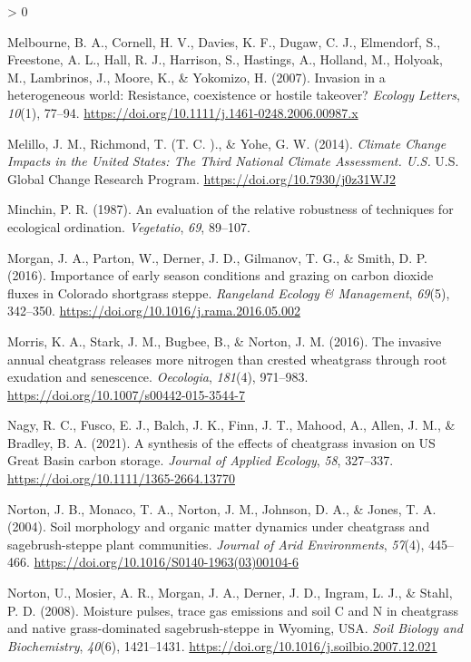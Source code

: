 \documentclass[
  11pt,
  a4paper,
]{article}
\newlength{\cslhangindent}
\newenvironment{CSLReferences}[2] %
 {%
  \setlength{\parindent}{0pt}
  \ifodd #1 \everypar{\setlength{\hangindent}{\cslhangindent}}\ignorespaces\fi
  \ifnum #2 > 0
  \setlength{\parskip}{#2\baselineskip}
  \fi
 }%
 {}
\begin{document}
\begin{CSLReferences}{1}{0}
\leavevmode\hypertarget{ref-Melbourne2007}{}%
Melbourne, B. A., Cornell, H. V., Davies, K. F., Dugaw, C. J., Elmendorf, S., Freestone, A. L., Hall, R. J., Harrison, S., Hastings, A., Holland, M., Holyoak, M., Lambrinos, J., Moore, K., \& Yokomizo, H. (2007). {Invasion in a heterogeneous world: Resistance, coexistence or hostile takeover?} \emph{Ecology Letters}, \emph{10}(1), 77--94. \url{https://doi.org/10.1111/j.1461-0248.2006.00987.x}

\leavevmode\hypertarget{ref-melillo2014}{}%
Melillo, J. M., Richmond, T. (T. C. )., \& Yohe, G. W. (2014). \emph{Climate {Change} {Impacts} in the {United} {States}: {The} {Third} {National} {Climate} {Assessment}. {U}.{S}.} U.S. Global Change Research Program. \url{https://doi.org/10.7930/j0z31WJ2}

\leavevmode\hypertarget{ref-Minchin1987}{}%
Minchin, P. R. (1987). {An evaluation of the relative robustness of techniques for ecological ordination}. \emph{Vegetatio}, \emph{69}, 89--107.

\leavevmode\hypertarget{ref-Morgan2016}{}%
Morgan, J. A., Parton, W., Derner, J. D., Gilmanov, T. G., \& Smith, D. P. (2016). Importance of {early} {season} {conditions} and {grazing} on {carbon} {dioxide} {fluxes} in {Colorado} {shortgrass} {steppe}. \emph{Rangeland Ecology \& Management}, \emph{69}(5), 342--350. \url{https://doi.org/10.1016/j.rama.2016.05.002}

\leavevmode\hypertarget{ref-Morris2016}{}%
Morris, K. A., Stark, J. M., Bugbee, B., \& Norton, J. M. (2016). {The invasive annual cheatgrass releases more nitrogen than crested wheatgrass through root exudation and senescence}. \emph{Oecologia}, \emph{181}(4), 971--983. \url{https://doi.org/10.1007/s00442-015-3544-7}

\leavevmode\hypertarget{ref-Nagy2021}{}%
Nagy, R. C., Fusco, E. J., Balch, J. K., Finn, J. T., Mahood, A., Allen, J. M., \& Bradley, B. A. (2021). {A synthesis of the effects of cheatgrass invasion on US Great Basin carbon storage}. \emph{Journal of Applied Ecology}, \emph{58}, 327--337. \url{https://doi.org/10.1111/1365-2664.13770}

\leavevmode\hypertarget{ref-Norton2004}{}%
Norton, J. B., Monaco, T. A., Norton, J. M., Johnson, D. A., \& Jones, T. A. (2004). {Soil morphology and organic matter dynamics under cheatgrass and sagebrush-steppe plant communities}. \emph{Journal of Arid Environments}, \emph{57}(4), 445--466. \url{https://doi.org/10.1016/S0140-1963(03)00104-6}

\leavevmode\hypertarget{ref-Norton2008}{}%
Norton, U., Mosier, A. R., Morgan, J. A., Derner, J. D., Ingram, L. J., \& Stahl, P. D. (2008). {Moisture pulses, trace gas emissions and soil C and N in cheatgrass and native grass-dominated sagebrush-steppe in Wyoming, USA}. \emph{Soil Biology and Biochemistry}, \emph{40}(6), 1421--1431. \url{https://doi.org/10.1016/j.soilbio.2007.12.021}


\end{CSLReferences}
\end{document}
